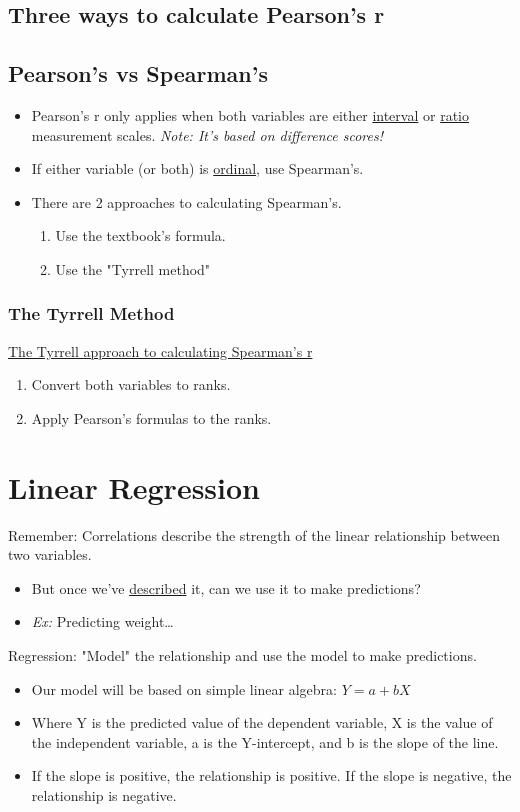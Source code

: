 \documentclass[11pt]{report}
\begin{document}
\subsection{Three ways to calculate Pearson's r}
\subsection{Pearson's vs Spearman's}
\begin{itemize}
    \item Pearson's r only applies when both variables are either \underline{interval} or \underline{ratio} measurement scales. \textit{Note: It's based on difference scores!}
    \item If either variable (or both) is \underline{ordinal}, use Spearman's.
    \item There are 2 approaches to calculating Spearman's. 
    \begin{enumerate}
        \item Use the textbook's formula.
        \item Use the "Tyrrell method"
    \end{enumerate}
\end{itemize}

\subsubsection{The Tyrrell Method}
\underline{The Tyrrell approach to calculating Spearman's r}
\begin{enumerate}
    \item Convert both variables to ranks. 
    \item Apply Pearson's formulas to the ranks. 
\end{enumerate}

\section{Linear Regression}
Remember: Correlations describe the strength of the linear relationship between two variables. 
\begin{itemize}
    \item But once we've \underline{described} it, can we use it to make predictions?
    \item \textit{Ex:} Predicting weight\dots
\end{itemize}
Regression: "Model" the relationship and use the model to make predictions. 
\begin{itemize}
    \item Our model will be based on simple linear algebra: $Y = a + bX$
    \item Where Y is the predicted value of the dependent variable, X is the value of the independent variable, a is the Y-intercept, and b is the slope of the line.
    \item If the slope is positive, the relationship is positive. If the slope is negative, the relationship is negative.
\end{itemize}
\end{document}
